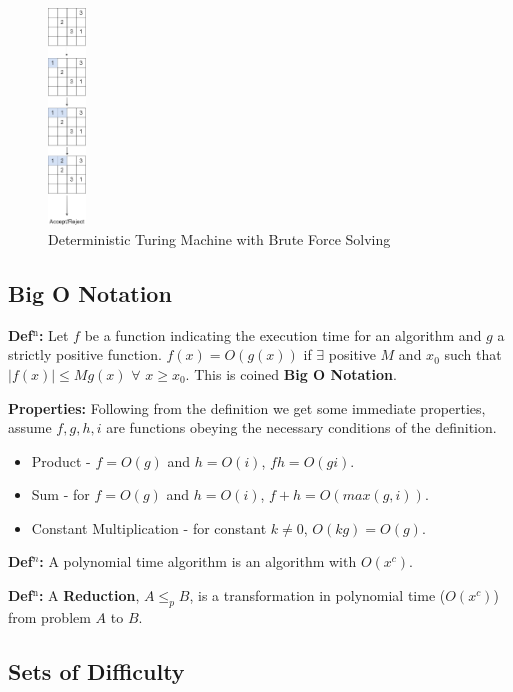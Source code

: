 \documentclass[a4paper,11pt]{report}
\begin{document}
\begin{figure}[h!]
	\begin{center}
		\includegraphics[width=10mm]{figures/turing_determinism.png}
	\end{center}
	\caption{\label{dtm} Deterministic Turing Machine with Brute Force Solving}
\end{figure}

\subsection{Big O Notation}

\textbf{Def$^\text{n}$:} Let $f$ be a function indicating the execution time for an algorithm and $g$ a strictly positive function. $f(x)=O (g(x))$ if $\exists$ positive $ M$ and $x_0$ such that $|f(x)|\leq Mg(x)$ $\forall$ $x\geq x_0$. This is coined \textbf{Big O Notation}.

\textbf{Properties:} Following from the definition we get some immediate properties, assume $f,g,h,i$ are functions obeying the necessary conditions of the definition.
\begin{itemize}
\item Product - $f=O(g)$ and $h=O(i)$, $fh=O(gi)$.
\item Sum - for $f=O(g)$ and $h=O(i)$, $f+h = O(max(g,i))$.
\item Constant Multiplication - for constant $k\neq0$, $O(kg)=O(g)$.
\end{itemize}

\textbf{Def$^n$:} A polynomial time algorithm is an algorithm with $O(x^c)$.

\textbf{Def$^\text{n}$:} A \textbf{Reduction}, $A \leq_p B$, is a transformation in polynomial time ($O(x^c)$) from problem $A$ to $B$.

\subsection{Sets of Difficulty} 
\end{document}
